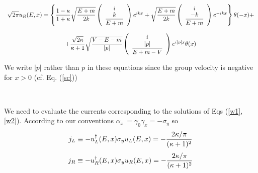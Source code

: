 \begin{equation}
\begin{array}{c}
\sqrt{2\pi }u_R(E,x)=\left\{ 
{\displaystyle {1-\kappa  \over 1+\kappa }}
\sqrt{%
{\displaystyle {E+m \over 2k}}
}\left( 
\begin{array}{c}
i \\ 
{\displaystyle {k \over E+m}}
\end{array}
\right) e^{ikx}+\sqrt{%
{\displaystyle {E+m \over 2k}}
}\left( 
\begin{array}{c}
i \\ 
{\displaystyle {-k \over E+m}}
\end{array}
\right) e^{-ikx}\right\} \theta (-x)+ \\ 
\\ 
+%
{\displaystyle {\sqrt{2\kappa } \over \kappa +1}}
\sqrt{%
{\displaystyle {V-E-m \over \left| p\right| }}
}\left( 
\begin{array}{c}
i \\ 
{\displaystyle {\left| p\right|  \over E+m-V}}
\end{array}
\right) e^{i\left| p\right| x}\theta (x)
\end{array}
\label{w2}
\end{equation}

\noindent We write $\left| p\right| $ rather than $p$ in these equations
since the group velocity is negative for $x>0$ (cf. Eq. (\ref{sc}))

\smallskip\ 

\noindent We need to evaluate the currents corresponding to the solutions of
Eqs (\ref{w1},\ref{w2}). According to our conventions $\alpha _x\,=\gamma
_0\gamma _x=-\sigma _y$ so 
\begin{equation}
j_L\equiv -u_L^{\dagger }(E,x)\sigma _yu_L(E,x)=-\frac{2\kappa /\pi }{%
(\kappa +1)^2}  \label{c1}
\end{equation}
\begin{equation}
j_R\equiv -u_R^{\dagger }(E,x)\sigma _yu_R(E,x)=-\frac{2\kappa /\pi }{%
(\kappa +1)^2}  \label{c2}
\end{equation}


